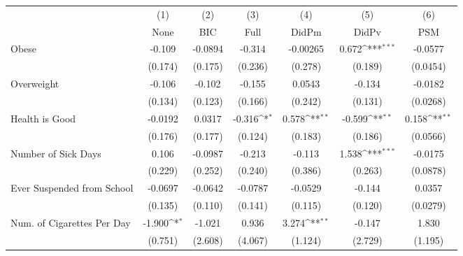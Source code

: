 {
\def\sym#1{\ifmmode^{#1}\else\(^{#1}\)\fi}
\begin{tabular}{l*{6}{c}}
\toprule
            &\multicolumn{1}{c}{(1)}&\multicolumn{1}{c}{(2)}&\multicolumn{1}{c}{(3)}&\multicolumn{1}{c}{(4)}&\multicolumn{1}{c}{(5)}&\multicolumn{1}{c}{(6)}\\
            &\multicolumn{1}{c}{None}&\multicolumn{1}{c}{BIC}&\multicolumn{1}{c}{Full}&\multicolumn{1}{c}{DidPm}&\multicolumn{1}{c}{DidPv}&\multicolumn{1}{c}{PSM}\\
\midrule
Obese       &      -0.109         &     -0.0894         &      -0.314         &    -0.00265         &       0.672\sym{***}&     -0.0577         \\
            &     (0.174)         &     (0.175)         &     (0.236)         &     (0.278)         &     (0.189)         &    (0.0454)         \\
\addlinespace
Overweight  &      -0.106         &      -0.102         &      -0.155         &      0.0543         &      -0.134         &     -0.0182         \\
            &     (0.134)         &     (0.123)         &     (0.166)         &     (0.242)         &     (0.131)         &    (0.0268)         \\
\addlinespace
Health is Good&     -0.0192         &      0.0317         &      -0.316\sym{*}  &       0.578\sym{**} &      -0.599\sym{**} &       0.158\sym{**} \\
            &     (0.176)         &     (0.177)         &     (0.124)         &     (0.183)         &     (0.186)         &    (0.0566)         \\
\addlinespace
Number of Sick Days&       0.106         &     -0.0987         &      -0.213         &      -0.113         &       1.538\sym{***}&     -0.0175         \\
            &     (0.229)         &     (0.252)         &     (0.240)         &     (0.386)         &     (0.263)         &    (0.0878)         \\
\addlinespace
Ever Suspended from School&     -0.0697         &     -0.0642         &     -0.0787         &     -0.0529         &      -0.144         &      0.0357         \\
            &     (0.135)         &     (0.110)         &     (0.141)         &     (0.115)         &     (0.120)         &    (0.0279)         \\
\addlinespace
Num. of Cigarettes Per Day&      -1.900\sym{*}  &      -1.021         &       0.936         &       3.274\sym{**} &      -0.147         &       1.830         \\
            &     (0.751)         &     (2.608)         &     (4.067)         &     (1.124)         &     (2.729)         &     (1.195)         \\
\bottomrule
\end{tabular}
}
